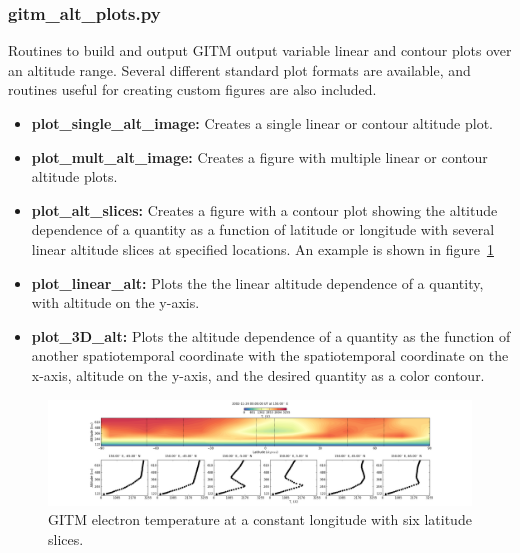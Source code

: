 \subsubsection{gitm\_alt\_plots.py}

Routines to build and output GITM output variable linear and contour plots over an altitude range.  Several different standard plot formats are available, and routines useful for creating custom figures are also included.

\begin{itemize}
\item[]{{\bf plot\_single\_alt\_image:}  Creates a single linear or contour altitude plot.}
\item[]{{\bf plot\_mult\_alt\_image:}  Creates a figure with multiple linear or contour altitude plots.}
\item[]{{\bf plot\_alt\_slices:}  Creates a figure with a contour plot showing the altitude dependence of a quantity as a function of latitude or longitude with several linear altitude slices at specified locations.  An example is shown in figure~\ref{gitm_alt_slices.fig}}
\item[]{{\bf plot\_linear\_alt:}  Plots the the linear altitude dependence of a quantity, with altitude on the y-axis.}
\item[]{{\bf plot\_3D\_alt:}  Plots the altitude dependence of a quantity as the function of another spatiotemporal coordinate with the spatiotemporal coordinate on the x-axis, altitude on the y-axis, and the desired quantity as a color contour.}
\end{itemize}

\begin{figure}
\begin{center}
\noindent\includegraphics[width=\textwidth]{Figures/gitm_alt_slice_test_Te.png}
\caption{GITM electron temperature at a constant longitude with six latitude slices.}
\label{gitm_alt_slices.fig}
\end{center}
\end{figure}









